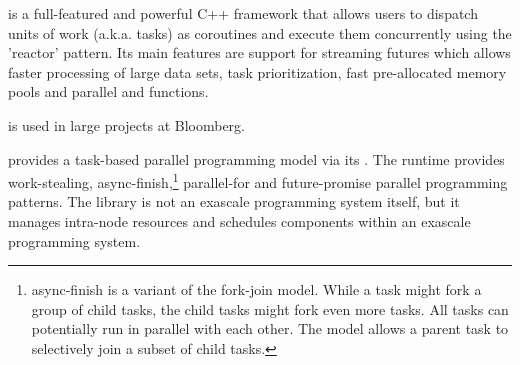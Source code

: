 \cite{bbquantum} is a full-featured and
powerful C++ framework that allows users to dispatch units of work (a.k.a.
tasks) as coroutines and execute them concurrently using the 'reactor' pattern.
Its main features are support for streaming futures which allows faster processing
of large data sets, task prioritization, fast pre-allocated memory pools and
parallel  and  functions.

\bbquantum\xspace is used in large projects at Bloomberg.

provides a task-based parallel programming model via its \hclib\cite{hclib}.
The runtime provides work-stealing, async-finish,\footnote{async-finish is a
variant of the fork-join model. While a task might fork a group of
child tasks, the child tasks might fork even more tasks. All tasks can
potentially run in parallel with each other. The model allows a parent task to
selectively join a subset of child tasks.}
parallel-for and future-promise parallel programming patterns. The library is not an exascale
programming system itself, but it manages intra-node resources and schedules
components within an exascale programming system.


